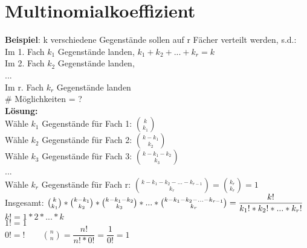 \section{Multinomialkoeffizient}
\textbf{Beispiel}: k verschiedene Gegenstände sollen auf r Fächer verteilt werden, s.d.:\\
Im 1. Fach $k_1$ Gegenstände landen, \hspace{1cm} $k_1 +k_2+ ... + k_r = k$\\
Im 2. Fach $k_2$ Gegenstände landen,\\...\\
Im r. Fach $k_r$ Gegenstände landen\smallskip\\\# Möglichkeiten = ?\medskip\\
\textbf{Lösung:}\\
Wähle $k_1$ Gegenstände für Fach 1: $\binom{k}{k_1}$\smallskip\\
Wähle $k_2$ Gegenstände für Fach 2: $\binom{k-k_1}{k_2}$\smallskip\\
Wähle $k_3$ Gegenstände für Fach 3: $\binom{k-k_1-k_2}{k_3}$\\
...\\
Wähle $k_r$ Gegenstände für Fach r: $\binom{k-k_1-k_2-...-k_{r-1}}{k_r} = \binom{k_r}{k_r} = 1$\medskip\\
Insgesamt: $\binom{k}{k_1}*\binom{k-k_1}{k_2}*\binom{k-k_1-k_2}{k_3}*...*\binom{k-k_1-k_2-...-k_{r-1}}{k_r} = \\\dfrac{k!}{k_1!*k_2!*...*k_r!}$\medskip\\
$k! = 1 * 2 * ... * k$\\
$1! = 1$\\
$0! = ! \qquad \binom{n}{n} = \dfrac{n!}{n!*0!}=\dfrac{1}{0!}=1$
